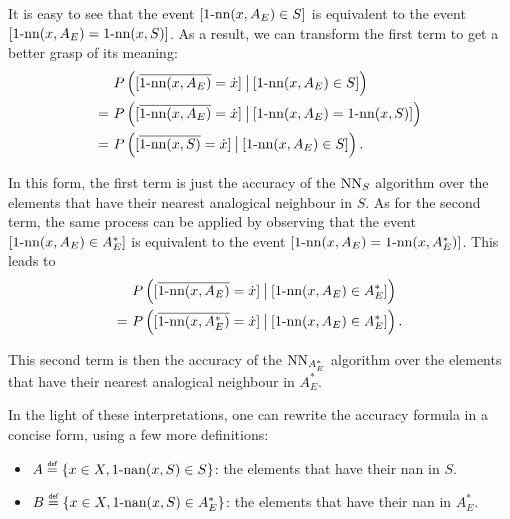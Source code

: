 It is easy to see that the event $[\nn(x, A_E) \in S]$ is equivalent to
the event $[\nn(x, A_E) = \nn(x, S)]$. As a result, we can transform the first
term to get a better grasp of its meaning:
\begin{align*}
  &P\left([\albl{\nn(x, A_E)} = \dot{x}] \given[\big] [\nn(x, A_E) \in S] \right)\\
  =~ &P\left([\albl{\nn(x, A_E)} = \dot{x}] \given[\big] [\nn(x, A_E) = \nn(x,
  S)]\right)\\
  =~ &P\left([\albl{\nn(x, S)} = \dot{x}] \given[\big] [\nn(x, A_E) \in S]\right).
\end{align*}

In this form, the first term is just the accuracy of the $\NN_S$ algorithm over
the elements that have their nearest analogical neighbour in $S$.
As for the second term, the same process can be applied by observing that the
event $[\nn(x, A_E) \in A_E^*]$ is equivalent to the event $[\nn(x, A_E) = \nn(x,
A_E^*)]$. This leads to
\begin{align*}
  &P\left([\albl{\nn(x, A_E)} = \dot{x}] \given[\big] [\nn(x, A_E) \in
A_E^*]\right)\\
  =~ &P\left([\albl{\nn(x, A_E^*)} = \dot{x}] \given[\big] [\nn(x, A_E) \in
A_E^*]\right).
\end{align*}

This second term is then the accuracy of the $\NN_{A_E^*}$ algorithm over the elements
that have their nearest analogical neighbour in $A_E^*$.

In the light of these interpretations, one can rewrite the accuracy formula in
a  concise form, using a few more definitions:
\begin{itemize}
\item $A \eqdef \{x \in X, \nan(x, S) \in S\}$: the elements that have
  their nan in $S$.
\item $B \eqdef \{x \in X, \nan(x, S) \in A_E^*\}$: the elements that have
  their nan in $A_E^*$.
\end{itemize}

